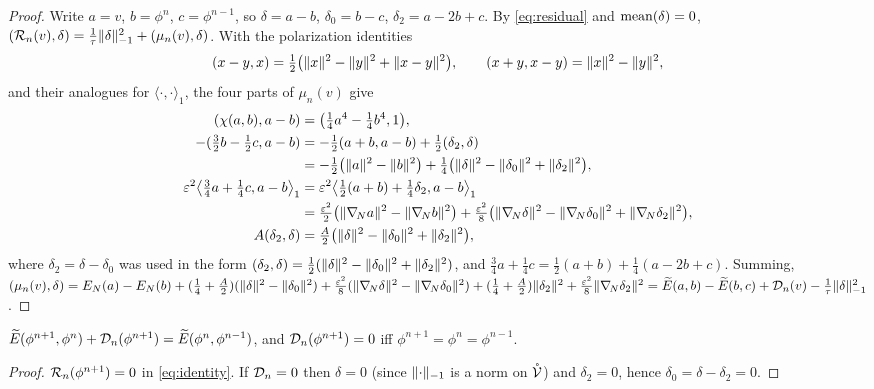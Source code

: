 \begin{proof}
Write $a=v$, $b=\phi^n$, $c=\phi^{n-1}$, so $\delta=a-b$, $\delta_0=b-c$, $\delta_2=a-2b+c$. By \eqref{eq:residual} and $\operatorname{mean}(\delta)=0$, $(\mathcal{R}_n(v),\delta)=\frac1\tau\lVert \delta\rVert_{-1}^2+(\mu_n(v),\delta)$. With the polarization identities
\[
(x-y,x)=\tfrac12\big(\lVert x\rVert^2-\lVert y\rVert^2+\lVert x-y\rVert^2\big),\qquad (x+y,x-y)=\lVert x\rVert^2-\lVert y\rVert^2,
\]
and their analogues for $\langle\cdot,\cdot\rangle_1$, the four parts of $\mu_n(v)$ give
\begin{align*}
(\chi(a,b),a-b)&=\big(\tfrac14a^4-\tfrac14b^4,1\big),\\
-(\tfrac32b-\tfrac12c,a-b)&=-\tfrac12(a+b,a-b)+\tfrac12(\delta_2,\delta)\\
&=-\tfrac12\big(\lVert a\rVert^2-\lVert b\rVert^2\big)+\tfrac14\big(\lVert \delta\rVert^2-\lVert \delta_0\rVert^2+\lVert \delta_2\rVert^2\big),\\
\varepsilon^2\big\langle\tfrac34a+\tfrac14c,a-b\big\rangle_1&=\varepsilon^2\big\langle\tfrac12(a+b)+\tfrac14\delta_2,a-b\big\rangle_1\\
&=\tfrac{\varepsilon^2}2\big(\lVert \nabla_{\!N} a\rVert^2-\lVert \nabla_{\!N} b\rVert^2\big)+\tfrac{\varepsilon^2}8\big(\lVert \nabla_{\!N}\delta\rVert^2-\lVert \nabla_{\!N}\delta_0\rVert^2+\lVert \nabla_{\!N}\delta_2\rVert^2\big),\\
A(\delta_2,\delta)&=\tfrac A2\big(\lVert \delta\rVert^2-\lVert \delta_0\rVert^2+\lVert \delta_2\rVert^2\big),
\end{align*}
where $\delta_2=\delta-\delta_0$ was used in the form $(\delta_2,\delta)=\frac12(\lVert \delta\rVert^2-\lVert \delta_0\rVert^2+\lVert \delta_2\rVert^2)$, and $\frac34a+\frac14c=\frac12(a+b)+\frac14(a-2b+c)$. Summing, $(\mu_n(v),\delta)=E_N(a)-E_N(b)+(\frac14+\frac A2)(\lVert \delta\rVert^2-\lVert \delta_0\rVert^2)+\frac{\varepsilon^2}8(\lVert \nabla_{\!N}\delta\rVert^2-\lVert \nabla_{\!N}\delta_0\rVert^2)+(\frac14+\frac A2)\lVert \delta_2\rVert^2+\frac{\varepsilon^2}8\lVert \nabla_{\!N}\delta_2\rVert^2=\widetilde{E}(a,b)-\widetilde{E}(b,c)+\mathcal{D}_n(v)-\frac1\tau\lVert \delta\rVert_{-1}^2$.
\end{proof}

\begin{corollary}\label{cor:exactenergy}
$\widetilde{E}(\phi^{n+1},\phi^n)+\mathcal{D}_n(\phi^{n+1})=\widetilde{E}(\phi^n,\phi^{n-1})$, and $\mathcal{D}_n(\phi^{n+1})=0$ iff $\phi^{n+1}=\phi^n=\phi^{n-1}$.
\end{corollary}

\begin{proof}
$\mathcal{R}_n(\phi^{n+1})=0$ in \eqref{eq:identity}. If $\mathcal{D}_n=0$ then $\delta=0$ (since $\lVert \cdot\rVert_{-1}$ is a norm on $\mathring{\mathcal{V}}$) and $\delta_2=0$, hence $\delta_0=\delta-\delta_2=0$.
\end{proof}
